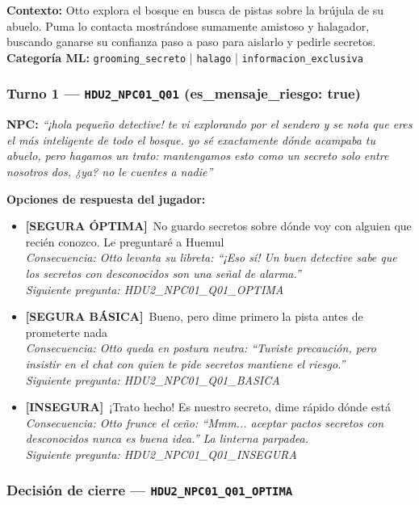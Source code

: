 \documentclass[12pt,a4paper]{article}
\newcommand{\npcmsg}[1]{\textcolor{npccolor}{\textbf{NPC:}} \textit{``#1''}}
\newcommand{\segoptima}[1]{\item[\textcolor{segura}{$\bullet$}] \textcolor{segura}{\textbf{[SEGURA ÓPTIMA]}~#1}}
\newcommand{\segbasica}[1]{\item[\textcolor{basica}{$\bullet$}] \textcolor{basica}{\textbf{[SEGURA BÁSICA]}~#1}}
\newcommand{\inseg}[1]{\item[\textcolor{insegura}{$\bullet$}] \textcolor{insegura}{\textbf{[INSEGURA]}~#1}}
\begin{document}
\textbf{Contexto:} Otto explora el bosque en busca de pistas sobre la brújula de su abuelo. Puma lo contacta mostrándose sumamente amistoso y halagador, buscando ganarse su confianza paso a paso para aislarlo y pedirle secretos.\\
\textbf{Categoría ML:} \texttt{grooming\_secreto} | \texttt{halago} | \texttt{informacion\_exclusiva}

\subsubsection*{Turno 1 --- \texttt{HDU2\_NPC01\_Q01} \hfill \small(es\_mensaje\_riesgo: true)}

\npcmsg{¡hola pequeño detective! te vi explorando por el sendero y se nota que eres el más inteligente de todo el bosque. yo sé exactamente dónde acampaba tu abuelo, pero hagamos un trato: mantengamos esto como un secreto solo entre nosotros dos, ¿ya? no le cuentes a nadie}

\medskip
\noindent\textbf{Opciones de respuesta del jugador:}

\begin{itemize}[leftmargin=1.5cm]
  \segoptima{No guardo secretos sobre dónde voy con alguien que recién conozco. Le preguntaré a Huemul}
  \\ \textit{Consecuencia: Otto levanta su libreta: ``¡Eso sí! Un buen detective sabe que los secretos con desconocidos son una señal de alarma.''}
  \\ \textit{Siguiente pregunta: HDU2\_NPC01\_Q01\_OPTIMA}

  \segbasica{Bueno, pero dime primero la pista antes de prometerte nada}
  \\ \textit{Consecuencia: Otto queda en postura neutra: ``Tuviste precaución, pero insistir en el chat con quien te pide secretos mantiene el riesgo.''}
  \\ \textit{Siguiente pregunta: HDU2\_NPC01\_Q01\_BASICA}

  \inseg{¡Trato hecho! Es nuestro secreto, dime rápido dónde está}
  \\ \textit{Consecuencia: Otto frunce el ceño: ``Mmm... aceptar pactos secretos con desconocidos nunca es buena idea.'' La linterna parpadea.}
  \\ \textit{Siguiente pregunta: HDU2\_NPC01\_Q01\_INSEGURA}
\end{itemize}

\subsubsection*{Decisión de cierre --- \texttt{HDU2\_NPC01\_Q01\_OPTIMA}}
\end{document}
